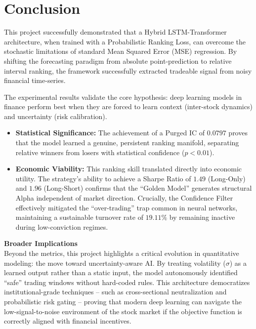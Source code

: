 \documentclass[twoside,final]{hcmut-report}
\begin{document}

\part{Conclusion}
This project successfully demonstrated that a Hybrid LSTM-Transformer architecture, when trained with a Probabilistic Ranking Loss, can overcome the stochastic limitations of standard Mean Squared Error (MSE) regression. By shifting the forecasting paradigm from absolute point-prediction to relative interval ranking, the framework successfully extracted tradeable signal from noisy financial time-series.

The experimental results validate the core hypothesis: deep learning models in finance perform best when they are forced to learn context (inter-stock dynamics) and uncertainty (risk calibration).

\begin{itemize}
  \item \textbf{Statistical Significance:} The achievement of a Purged IC of $0.0797$ proves that the model learned a genuine, persistent ranking manifold, separating relative winners from losers with statistical confidence ($p < 0.01$).
  \item \textbf{Economic Viability:} This ranking skill translated directly into economic utility. The strategy’s ability to achieve a Sharpe Ratio of $1.49$ (Long-Only) and $1.96$ (Long-Short) confirms that the ``Golden Model'' generates structural Alpha independent of market direction. Crucially, the Confidence Filter effectively mitigated the ``over-trading'' trap common in neural networks, maintaining a sustainable turnover rate of $19.11\%$ by remaining inactive during low-conviction regimes.
\end{itemize}

\textbf{Broader Implications} \\
Beyond the metrics, this project highlights a critical evolution in quantitative modeling: the move toward uncertainty-aware AI. By treating volatility ($\sigma$) as a learned output rather than a static input, the model autonomously identified ``safe'' trading windows without hard-coded rules. This architecture democratizes institutional-grade techniques -- such as cross-sectional neutralization and probabilistic risk gating -- proving that modern deep learning can navigate the low-signal-to-noise environment of the stock market if the objective function is correctly aligned with financial incentives.
\end{document}
